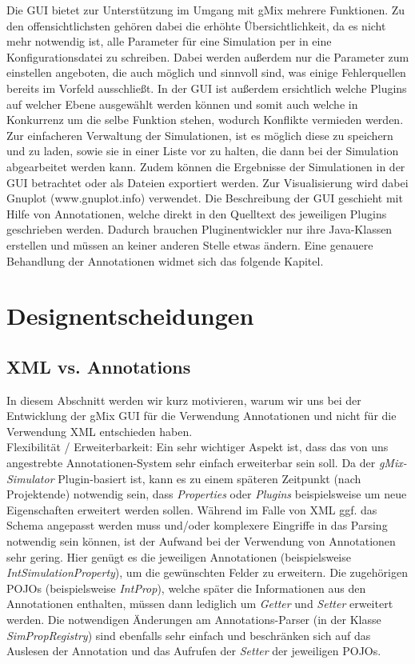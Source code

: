 \documentclass[a4paper, 11pt]{article} %
\begin{document}
Die GUI bietet zur Unterstützung im Umgang mit gMix mehrere Funktionen. Zu den offensichtlichsten gehören dabei die erhöhte Übersichtlichkeit, da es nicht mehr notwendig ist, alle Parameter für eine Simulation per in eine Konfigurationsdatei zu schreiben. Dabei werden außerdem nur die Parameter zum einstellen angeboten, die auch möglich und sinnvoll sind, was einige Fehlerquellen bereits im Vorfeld ausschließt. In der GUI  ist außerdem ersichtlich welche Plugins auf welcher Ebene ausgewählt werden können und somit auch welche in Konkurrenz um die selbe Funktion stehen, wodurch Konflikte vermieden werden. Zur einfacheren Verwaltung der Simulationen, ist es möglich diese zu speichern und zu laden, sowie sie in einer Liste vor zu halten, die dann bei der Simulation abgearbeitet werden kann. Zudem können die Ergebnisse der Simulationen in der GUI betrachtet oder als Dateien exportiert werden. Zur Visualisierung wird dabei Gnuplot (www.gnuplot.info) verwendet. Die Beschreibung der GUI geschieht mit Hilfe von Annotationen, welche direkt in den Quelltext des jeweiligen Plugins geschrieben werden. Dadurch brauchen Pluginentwickler nur ihre Java-Klassen erstellen und müssen an keiner anderen Stelle etwas ändern. Eine genauere Behandlung der Annotationen widmet sich das folgende Kapitel.

\section{Designentscheidungen} %
\label{sec:designentscheidungen}

\subsection{XML vs. Annotations} %
\label{sub:xml}
In diesem Abschnitt werden wir kurz motivieren, warum wir uns bei der Entwicklung der gMix GUI für die Verwendung Annotationen und nicht für die Verwendung XML entschieden haben.\\

Flexibilität / Erweiterbarkeit: Ein sehr wichtiger Aspekt ist, dass das von uns angestrebte Annotationen-System sehr einfach erweiterbar sein soll. Da der \emph{gMix-Simulator} Plugin-basiert ist, kann es zu einem späteren Zeitpunkt (nach Projektende) notwendig sein, dass \emph{Properties} oder \emph{Plugins} beispielsweise um neue Eigenschaften erweitert werden sollen. Während im Falle von XML ggf. das Schema angepasst werden muss und/oder komplexere Eingriffe in das Parsing notwendig sein können, ist der Aufwand bei der Verwendung von Annotationen sehr gering. Hier genügt es die jeweiligen Annotationen (beispielsweise \emph{IntSimulationProperty}), um die gewünschten Felder zu erweitern. Die zugehörigen POJOs (beispielsweise \emph{IntProp}), welche später die Informationen aus den Annotationen enthalten, müssen dann lediglich um \emph{Getter} und \emph{Setter} erweitert werden. Die notwendigen Änderungen am Annotations-Parser (in der Klasse \emph{SimPropRegistry}) sind ebenfalls sehr einfach und beschränken sich auf das Auslesen der Annotation und das Aufrufen der \emph{Setter} der jeweiligen POJOs.\\
\end{document}
